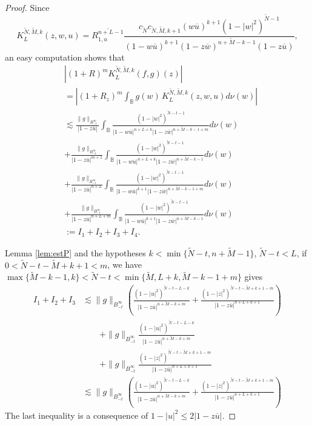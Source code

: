 \documentclass[12pt,twoside,leqno,final]{amsart}
\theoremstyle{plain}
\begin{document}
\begin{proof}
Since 
$$
K^{\tilde N,\tilde M,k}_L(z,w,u)=\overline{R^{n+L-1}_{1,u}}
\frac{c_{\tilde N}c_{\tilde N,\tilde M,k+1}(w\overline u)^{k+1}(1-|w|^2)^{\tilde N-1}}
{(1-w\overline u)^{k+1}(1-z\overline w)^{n+\tilde M-k-1}(1-z\overline u)},
$$
an easy computation shows that 
\begin{align*}
&|(1+R)^m K^{\tilde N,\tilde M,k}_L(f,g)(z)|\\
&=\left|(1+R_z)^m \int_{{\mathbb B}} g(w)\, K^{\tilde N,\tilde M,k}_L(z,w,u) d\nu(w)\right|\\
&\lesssim \frac{\|g\|_{B^\infty_{-t}}}{|1-z\overline u|}\int_{{\mathbb B}}\frac{(1-|w|^2)^{\tilde N-t-1}}
{|1-w\overline u|^{n+L+k}|1-z\overline w|^{n+\tilde M-k-1+m}}d\nu(w)\\
&+ \frac{\|g\|_{B^\infty_{-t}}}{|1-z\overline u|^{m+1}}\int_{{\mathbb B}}\frac{(1-|w|^2)^{\tilde N-t-1}}
{|1-w\overline u|^{n+L+k}|1-z\overline w|^{n+\tilde M-k-1}}d\nu(w)\\
&+ \frac{\|g\|_{B^\infty_{-t}}}{|1-z\overline u|^{n+L}}\int_{{\mathbb B}}\frac{(1-|w|^2)^{\tilde N-t-1}}
{|1-w\overline u|^{k+1}|1-z\overline w|^{n+\tilde M-k-1+m}}d\nu(w)\\
&+ \frac{\|g\|_{B^\infty_{-t}}}{|1-z\overline u|^{n+L+m}}\int_{{\mathbb B}}\frac{(1-|w|^2)^{\tilde N-t-1}}
{|1-w\overline u|^{k+1}|1-z\overline w|^{n+\tilde M-k-1}}d\nu(w)\\
&:=I_1+I_2+I_3+I_4.
\end{align*}

Lemma \ref{lem:estP} and the hypotheses  $k<\min\{\tilde N-t,n+\tilde M-1\}$, 
$\tilde N-t<L$,  if $0< \tilde N-t-\tilde M+k+1<m$, we have 
$\max\{\tilde M-k-1,k\}<\tilde N-t<\min\{\tilde M,L+k,\tilde M-k-1+m\}$ gives
\begin{align*}
I_1+I_2+I_3
&\lesssim\|g\|_{B^\infty_{-t}}\left(\frac{(1-|u|^2)^{\tilde N-t-L-k}}
{|1-z\overline u|^{n+\tilde M-k+m}}
+\frac{(1-|z|^2)^{\tilde N-t-\tilde M+k+1-m}}{|1-z\overline u|^{n+L+k+1}}\right)\\
&\qquad+\|g\|_{B^\infty_{-t}}
\frac{(1-|u|^2)^{\tilde N-t-L-k}}{|1-z\overline u|^{n+\tilde M-k+m}}\\
&\qquad+\|g\|_{B^\infty_{-t}}
\frac{(1-|z|^2)^{\tilde N-t-\tilde M+k+1-m}}{|1-z\overline u|^{n+L+k+1}}\\
&\lesssim \|g\|_{B^\infty_{-t}}
\left(\frac{(1-|u|^2)^{\tilde N-t-L-k}}{|1-z\overline u|^{n+\tilde M-k+m}} 
+\frac{(1-|z|^2)^{\tilde N-t-\tilde M+k+1-m}}{|1-z\overline u|^{n+L+k+1}} \right)
\end{align*}
The last inequality is a consequence of $1-|u|^2\le 2 |1-z\overline u|$. 


\end{proof}
\end{document}
